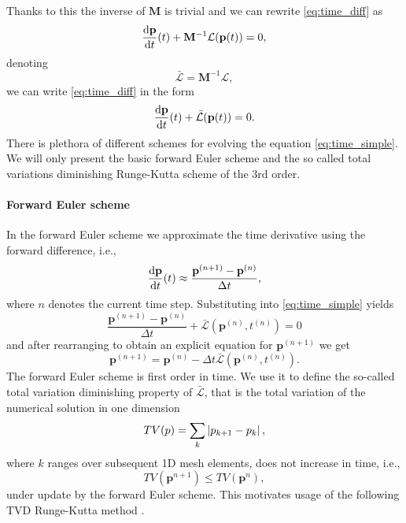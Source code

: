 Thanks to this the inverse of $\mathbf{M}$ is trivial and we can rewrite
\eqref{eq:time_diff} as
\begin{equation}
\frac{\text{d}\mathbf{p}}{\text{d}t}(t) + \mathbf{M}^{-1}\mathcal{L}(\mathbf{p}(t)) = 0,
\end{equation}
denoting
\begin{equation}
\bar{\mathcal{L}} =\mathbf{M}^{-1}\mathcal{L},
\end{equation}
we can write
\eqref{eq:time_diff} in the form
\begin{equation}\label{eq:time_simple}
\frac{\text{d}\mathbf{p}}{\text{d}t}(t) + \bar{\mathcal{L}}(\mathbf{p}(t)) = 0.
\end{equation}
There is plethora of different schemes for evolving the equation
\eqref{eq:time_simple}. We will only present the basic forward Euler scheme and
the so called
total variations diminishing Runge-Kutta scheme of the 3rd order.


\paragraph{Forward Euler scheme} In the forward Euler scheme we approximate the time
derivative using the forward difference, i.e.,
\begin{equation}
\frac{\text{d}\mathbf{p}}{\text{d}t}(t) \approx \frac{\mathbf{p}^{(n + 1)} - \mathbf{p}^{(n)}}{\Delta t},
\end{equation}
where $n$ denotes the current time step. Substituting into \eqref{eq:time_simple}
yields
\begin{equation}
\frac{\mathbf{p}^{(n + 1)} - \mathbf{p}^{(n)}}{\Delta t} +
\bar{\mathcal{L}}(\mathbf{p}^{(n)}, t^{(n)}) = 0
\end{equation}
and after rearranging to obtain an explicit equation for $\mathbf{p}^{(n + 1)}$ we
get
\begin{equation}
\mathbf{p}^{(n + 1)} = \mathbf{p}^{(n)} - {\Delta t}
\bar{\mathcal{L}}(\mathbf{p}^{(n)}, t^{(n)}).
\end{equation}
The forward Euler scheme is first order in time. We use it to define the so-called
total variation diminishing property of $\bar{\mathcal{L}}$, that is the total
variation of the numerical solution in one dimension
\begin{equation}
\label{eq:TV}
TV(p) = \sum_{k} \left\lvert p_{k + 1} - p_{k}\right\rvert,
\end{equation}
where $k$ ranges over subsequent 1D mesh elements, does not increase in time, i.e.,
\begin{equation}
TV(\mathbf{p}^{n + 1}) \leq TV(\mathbf{p}^{n}),
\end{equation}
under update by the forward Euler scheme.
This motivates usage of the following TVD Runge-Kutta method \cite[p. 73]{Gottlieb2002}.



